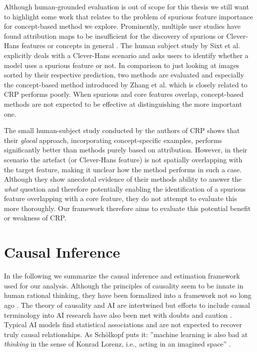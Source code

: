 Although human-grounded evaluation is out of scope for this thesis we still want to highlight some work that relates to the problem of spurious feature importance for concept-based method we explore. 
Prominently, multiple user studies have found attribution maps to be insufficient for the discovery of spurious or Clever-Hans features or concepts in general \cite{Sixt2022a,Rong2023,Kim2018}. 
The human subject study by Sixt et al. \cite{Sixt2022a} explicitly deals with a Clever-Hans scenario and asks users to identify whether a model uses a spurious feature or not. In comparison to just looking at images sorted by their respective prediction, two methods are evaluated and especially the concept-based method introduced by Zhang et al. \cite{Zhang2021} which is closely related to CRP performs poorly. When spurious and core features overlap, concept-based methods are not expected to be effective at distinguishing the more important one. 

The small human-subject study conducted by the authors of CRP \cite{Achtibat2023} shows that their \textit{glocal} approach, incorporating concept-specific examples, performs significantly better than methods purely based on attribution. However, in their scenario the artefact (or Clever-Hans feature) is not spatially overlapping with the target feature, making it unclear how the method performs in such a case. Although they show anecdotal evidence of their methods ability to answer the \textit{what} question and therefore potentially enabling the identification of a spurious feature overlapping with a core feature, they do not attempt to evaluate this more thoroughly. Our framework therefore aims to evaluate this potential benefit or weakness of CRP. 

\section{Causal Inference}\label{section:causal_inference_framework}
In the following we summarize the causal inference and estimation framework used for our analysis. 
Although the principles of causality seem to be innate in human rational thinking, they have been formalized into a framework not so long ago \cite{Spirtes1993, Halpern2005, Pearl2009, Peters2017}. The theory of causality and AI are intertwined but efforts to include causal terminology into AI research have also been met with doubts and caution \cite{Schoelkopf2019}. Typical AI models find statistical associations and are not expected to recover truly causal relationships. As Schölkopf puts it: ''machine learning is also bad at \textit{thinking} in the sense of Konrad Lorenz, i.e., acting in an imagined space'' \cite{Schoelkopf2019}.


